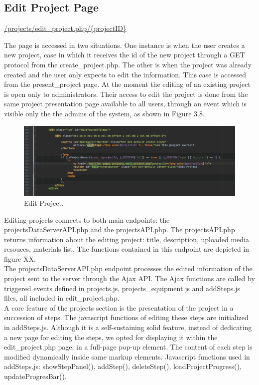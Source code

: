 \subsection{Edit Project Page}
\url{/projects/edit\_project.php/{projectID}}

The page is accessed in two situations. One instance is when the user creates a new project, case in which it receives the id of the new project through a GET protocol from the create\_project.php.
The other is when the project was already created and the user only expects to edit the information. This case is accessed from the present\_project page. At the moment the editing of an existing project is open only to administrators. Their access to edit the project is done from the same project presentation page available to all users, through an event which is visible only the the admins of the system, as shown in Figure 3.8.\\

\begin{figure}
\includegraphics[width=1\linewidth]{images/edit.png}
\caption{Edit Project.}
\label{fig:edit_project.}
\end{figure}	

Editing projects connects to both main endpoints: the projectsDataServerAPI.php and the projectsAPI.php. The projectsAPI.php returns information about the editing project: title, description, uploaded media resouces, materials list. The functions contained in this endpoint are depicted in figure XX. \\	

The projectsDataServerAPI.php endpoint processes the edited information of the project sent to the server through the Ajax API. The Ajax functions are called by triggered events defined in projects.js, projects\_equipment.js and addSteps.js files, all included in edit\_project.php.\\

A core feature of the projects section is the presentation of the project in a succession of steps. The javascript functions of editing these steps are initialized in addSteps.js.
Although it is a self-sustaining solid feature, instead of dedicating a new page for editing the steps, we opted for displaying it within the edit\_project.php page, in a full-page pop-up element. The content of each step is modified dynamically inside same markup elements. Javascript functions used in addSteps.js: showStepPanel(), addStep(), deleteStep(), loadProjectProgress(), updateProgresBar().\\

